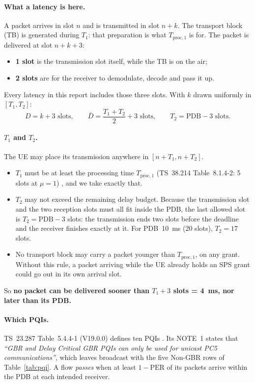 \documentclass{article}
\newcommand{\Tone}{T_1}
\newcommand{\Ttwo}{T_2}
\newcommand{\Tproc}{T_{\mathrm{proc},1}}
\begin{document}
\paragraph{What a latency is here.} A packet arrives in slot $n$ and is
transmitted in slot $n + k$. The transport block (TB) is generated
during $\Tone$: that preparation is what $\Tproc$ is for. The packet is
delivered at slot $n + k + 3$:
\begin{itemize}[nosep]
  \item \textbf{1 slot} is the transmission slot itself, while the TB is on the air;
  \item \textbf{2 slots} are for the receiver to demodulate, decode and pass it up.
\end{itemize}
Every latency in this report includes those three slots. With $k$
drawn uniformly in $[\Tone, \Ttwo]$:
\begin{equation}
\label{eq:latency}
D = k + 3 \text{ slots}, \qquad
\bar{D} = \frac{\Tone + \Ttwo}{2} + 3 \text{ slots}, \qquad
\Ttwo = \mathrm{PDB} - 3 \text{ slots}.
\end{equation}

\paragraph{$\Tone$ and $\Ttwo$.} The UE may place its transmission
anywhere in $[n + \Tone, n + \Ttwo]$.
\begin{itemize}[nosep]
  \item $\Tone$ must be at least the processing time $\Tproc$
  (TS~38.214 Table~8.1.4-2: 5 slots at $\mu = 1$) \cite{ref:38214}, and
  we take exactly that.
  \item $\Ttwo$ may not exceed the remaining delay budget. Because the
  transmission slot and the two reception slots must all fit inside the
  PDB, the last allowed slot is $\Ttwo = \mathrm{PDB} - 3$ slots: the
  transmission ends two slots before the deadline and the receiver
  finishes exactly at it. For PDB~10~ms (20 slots), $\Ttwo = 17$ slots.
  \item No transport block may carry a packet younger than $\Tproc$, on
  any grant. Without this rule, a packet arriving while the UE already
  holds an SPS grant could go out in its own arrival slot.
\end{itemize}
So \textbf{no packet can be delivered sooner than $\Tone + 3$ slots =
4~ms, nor later than its PDB.}

\paragraph{Which PQIs.} TS~23.287 Table~5.4.4-1 (V19.0.0) defines ten
PQIs \cite{ref:23287}. Its NOTE~1 states that \emph{``GBR and Delay
Critical GBR PQIs can only be used for unicast PC5 communications''},
which leaves broadcast with the five Non-GBR rows of
Table~\ref{tab:pqi}. A flow \emph{passes} when at least $1 -
\mathrm{PER}$ of its packets arrive within the PDB at each intended
receiver.
\end{document}
